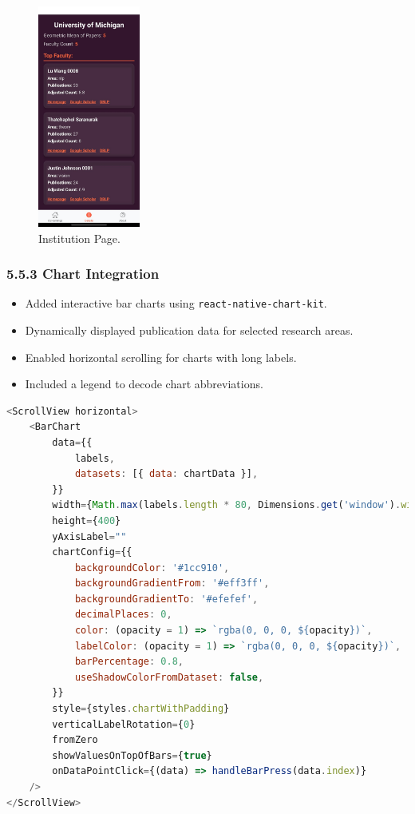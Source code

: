 \documentclass[12pt]{article}
\begin{document}
\begin{figure}[H]
    \centering
    \includegraphics[width=0.3\textwidth, height=0.5\textheight]{institution.jpg} %
    \caption{Institution Page.}
    \label{fig:example_image}
\end{figure}


\clearpage
\subsubsection*{5.5.3 Chart Integration}
\begin{itemize}
    \item Added interactive bar charts using \texttt{react-native-chart-kit}.
    \item Dynamically displayed publication data for selected research areas.
    \item Enabled horizontal scrolling for charts with long labels.
    \item Included a legend to decode chart abbreviations.
\end{itemize}

\begin{lstlisting}[language=JavaScript, caption={BarChart Integration within ScrollView}, label={lst:BarChart}]
<ScrollView horizontal>
    <BarChart
        data={{
            labels,
            datasets: [{ data: chartData }],
        }}
        width={Math.max(labels.length * 80, Dimensions.get('window').width - 20)}
        height={400}
        yAxisLabel=""
        chartConfig={{
            backgroundColor: '#1cc910',
            backgroundGradientFrom: '#eff3ff',
            backgroundGradientTo: '#efefef',
            decimalPlaces: 0,
            color: (opacity = 1) => `rgba(0, 0, 0, ${opacity})`,
            labelColor: (opacity = 1) => `rgba(0, 0, 0, ${opacity})`,
            barPercentage: 0.8,
            useShadowColorFromDataset: false,
        }}
        style={styles.chartWithPadding}
        verticalLabelRotation={0}
        fromZero
        showValuesOnTopOfBars={true}
        onDataPointClick={(data) => handleBarPress(data.index)}
    />
</ScrollView>
\end{lstlisting}
\end{document}
